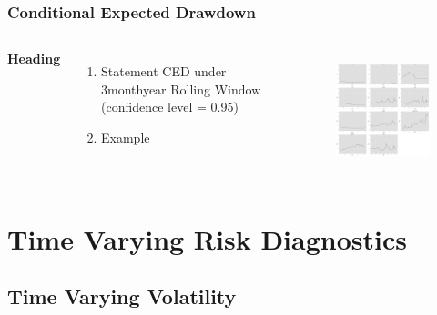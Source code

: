 \documentclass{beamer}
\newcommand\Fontviii{\fontsize{8}{9.2}\selectfont}
\begin{document}

\begin{frame}
\frametitle{Conditional Expected Drawdown}
\Fontviii
\begin{columns}[c] %

\textbf{Heading}
\begin{enumerate}
\item Statement
CED under 3\-month\-year Rolling Window (confidence level = 0.95)
\item Example
\end{enumerate}

\begin{figure}[h]
\centering 
\includegraphics[width=6.5cm]{../results/CED_3mon_5yr_95}
\label{fig: CED3mon5yr95}
\end{figure}
\end{columns}
\end{frame}

\section{Time Varying Risk Diagnostics}
\subsection{Time Varying Volatility}
\end{document}
